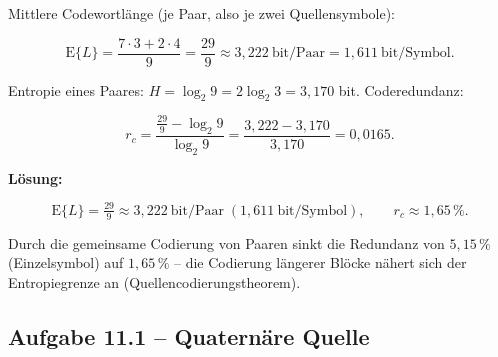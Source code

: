 \begin{beispiel}
Mittlere Codewortlänge (je Paar, also je zwei Quellensymbole):

$$
\mathrm{E}\{L\} = \frac{7\cdot 3 + 2\cdot 4}{9} = \frac{29}{9}
\approx 3{,}222\ \text{bit/Paar} = 1{,}611\ \text{bit/Symbol}.
$$

Entropie eines Paares: $H = \log_2 9 = 2\log_2 3 = 3{,}170$ bit. Coderedundanz:

$$
r_c = \frac{\tfrac{29}{9} - \log_2 9}{\log_2 9}
= \frac{3{,}222 - 3{,}170}{3{,}170} = 0{,}0165.
$$

\textbf{Lösung:}

$$
\boxed{\;\mathrm{E}\{L\} = \tfrac{29}{9} \approx 3{,}222\ \text{bit/Paar}
\;(1{,}611\ \text{bit/Symbol}), \qquad r_c \approx 1{,}65\,\%.\;}
$$

Durch die gemeinsame Codierung von Paaren sinkt die Redundanz von $5{,}15\,\%$
(Einzelsymbol) auf $1{,}65\,\%$ -- die Codierung längerer Blöcke nähert sich der
Entropiegrenze an (Quellencodierungstheorem).

\end{beispiel}

\subsection*{Aufgabe 11.1 – Quaternäre Quelle}

